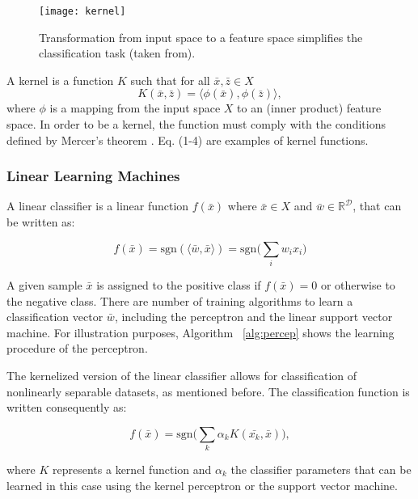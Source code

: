 \begin{figure}[ht]
	\centering
		\texttt{[image: kernel]}
	\caption[Transformation from input space to a feature space simplifies the classification task.]%
	{Transformation from input space to a feature space simplifies the classification task (taken from\cite{cristianini04}).}
	\label{fig:im10}
\end{figure}

A kernel is a function \(K\) such that for all \(\bar{x},\bar{z} \in X\) \[K(\bar{x},\bar{z})=\langle \phi(\bar{x}) ,\phi(\bar{z}) \rangle,\] where \(\phi\) is a mapping from the input space \(X\) to an (inner product) feature space. In order to be a kernel, the function must comply with the conditions defined by Mercer's theorem \cite{cristianini04}.  Eq. (1-4) are examples of kernel functions.

\subsubsection{Linear Learning Machines}
A linear classifier is a linear function \(f(\bar{x})\) where \(\bar{x} \in X\) and \(\bar{w} \in \mathbb{R}^\mathcal{D}\), that can be written as:

\begin{equation}
	f(\bar{x})=\text{sgn}(\langle \bar{w}, \bar{x} \rangle) = \text{sgn} \Big( \sum_{i} w_i x_i\Big)
\label{eq:eq05}
\end{equation}

A given sample \(\bar{x}\) is assigned to the positive class if \(f(\bar{x})=0\) or otherwise to the negative class.  There are number of training algorithms to learn a classification vector \(\bar{w}\), including the perceptron\cite{rosenblatt58} and the linear support vector machine\cite{cristianini00}.  For illustration purposes, Algorithm ~\ref{alg:percep} shows the learning procedure of the perceptron.

The kernelized version of the linear classifier allows for classification of nonlinearly separable datasets, as mentioned before.  The classification function is written consequently as:

\begin{equation}
	f(\bar{x}) = \text{sgn}\Big( \sum_{k} \alpha_k K(\bar{x_k},\bar{x}) \Big),
\label{eq:eq06}
\end{equation}

where \(K\) represents a kernel function and \(\alpha_k\) the classifier parameters that can be learned in this case using the kernel perceptron\cite{freund99} or the support vector machine\cite{vapnik95, cristianini00}. 

